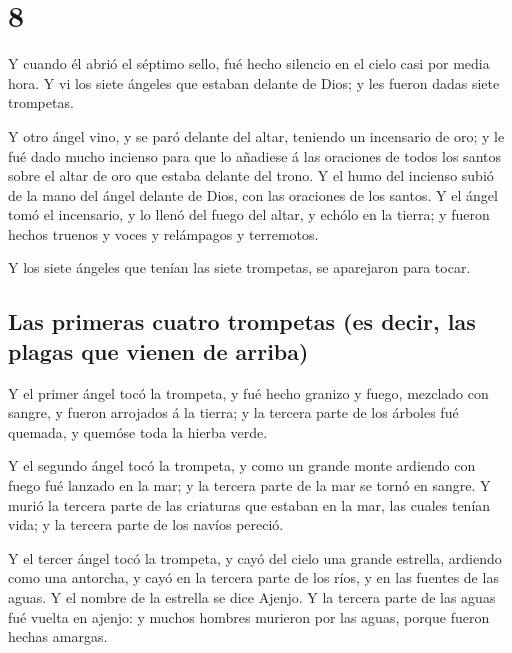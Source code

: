 \hypertarget{section-66-8}{%
\section{8}\label{section-66-8}}

 Y cuando él abrió el séptimo sello, fué hecho silencio en
el cielo casi por media hora.  Y vi los siete ángeles que
estaban delante de Dios; y les fueron dadas siete trompetas.

 Y otro ángel vino, y se paró delante del altar, teniendo
un incensario de oro; y le fué dado mucho incienso para que lo añadiese
á las oraciones de todos los santos sobre el altar de oro que estaba
delante del trono.  Y el humo del incienso subió de la
mano del ángel delante de Dios, con las oraciones de los santos.
 Y el ángel tomó el incensario, y lo llenó del fuego del
altar, y echólo en la tierra; y fueron hechos truenos y voces y
relámpagos y terremotos.

 Y los siete ángeles que tenían las siete trompetas, se
aparejaron para tocar.

\hypertarget{las-primeras-cuatro-trompetas-es-decir-las-plagas-que-vienen-de-arriba}{%
\subsection{Las primeras cuatro trompetas (es decir, las plagas que
vienen de
arriba)}\label{las-primeras-cuatro-trompetas-es-decir-las-plagas-que-vienen-de-arriba}}

 Y el primer ángel tocó la trompeta, y fué hecho granizo y
fuego, mezclado con sangre, y fueron arrojados á la tierra; y la tercera
parte de los árboles fué quemada, y quemóse toda la hierba verde.

 Y el segundo ángel tocó la trompeta, y como un grande
monte ardiendo con fuego fué lanzado en la mar; y la tercera parte de la
mar se tornó en sangre.  Y murió la tercera parte de las
criaturas que estaban en la mar, las cuales tenían vida; y la tercera
parte de los navíos pereció.

 Y el tercer ángel tocó la trompeta, y cayó del cielo una
grande estrella, ardiendo como una antorcha, y cayó en la tercera parte
de los ríos, y en las fuentes de las aguas.  Y el nombre
de la estrella se dice Ajenjo. Y la tercera parte de las aguas fué
vuelta en ajenjo: y muchos hombres murieron por las aguas, porque fueron
hechas amargas.

